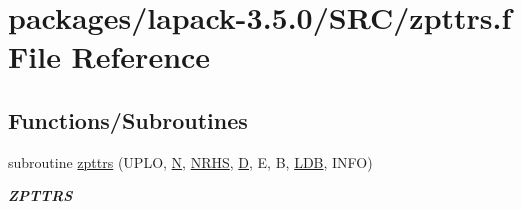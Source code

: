\hypertarget{zpttrs_8f}{}\section{packages/lapack-\/3.5.0/\+S\+R\+C/zpttrs.f File Reference}
\label{zpttrs_8f}
\subsection*{Functions/\+Subroutines}
\begin{DoxyCompactItemize}
\item 
subroutine \hyperlink{group__complex16PTcomputational_ga7a91b8a69883b74c20c26aee3c537c55}{zpttrs} (U\+P\+L\+O, \hyperlink{polmisc_8c_a0240ac851181b84ac374872dc5434ee4}{N}, \hyperlink{example__user_8c_aa0138da002ce2a90360df2f521eb3198}{N\+R\+H\+S}, \hyperlink{odrpack_8h_a7dae6ea403d00f3687f24a874e67d139}{D}, E, B, \hyperlink{example__user_8c_a50e90a7104df172b5a89a06c47fcca04}{L\+D\+B}, I\+N\+F\+O)
\begin{DoxyCompactList}\small\item\em {\bfseries Z\+P\+T\+T\+R\+S} \end{DoxyCompactList}\end{DoxyCompactItemize}
